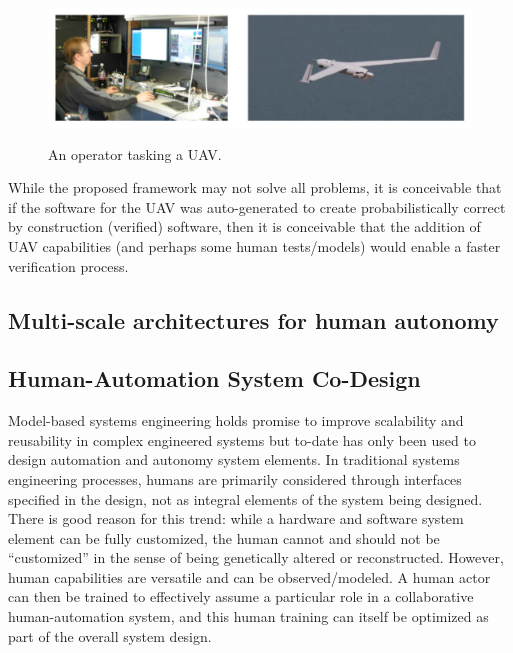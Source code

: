 \begin{figure}[h] %
   \centering
   \includegraphics[height=1.5in]{uav-operator.pdf} 
   \caption{An operator tasking a UAV. }
   \label{fig:uav-operator}
\end{figure}


While the proposed framework may not solve all problems, it is conceivable that if the software for the UAV was auto-generated to create probabilistically correct by construction (verified) software, then it is conceivable that the addition of UAV capabilities (and perhaps some human tests/models) would enable a faster verification process. 



\subsection*{Multi-scale architectures for human autonomy}



\subsection*{Human-Automation System Co-Design}

Model-based systems engineering holds promise to improve scalability and reusability in complex 
engineered systems but to-date has only been used to design automation and autonomy system elements.
In traditional systems engineering processes, humans are primarily considered through interfaces 
specified in the design, not as integral elements of the system being designed.  
There is good reason 
for this trend:  while a hardware and software system element can be fully customized, the human 
cannot and should not be ``customized'' in the sense of being genetically altered or reconstructed.
However, human capabilities are versatile and can be observed/modeled.  A human actor can then 
be trained to effectively assume a particular role in a collaborative human-automation system, 
and this human training can itself be optimized as part of the overall system design.

